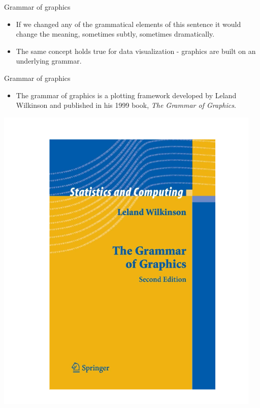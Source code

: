 \documentclass[
  ignorenonframetext,
]{beamer}
\providecommand{\tightlist}{%
  \setlength{\itemsep}{0pt}\setlength{\parskip}{0pt}}
\begin{document}
\begin{frame}{Grammar of graphics}
\label{grammar-of-graphics}
\begin{itemize}
\item
  If we changed any of the grammatical elements of this sentence it
  would change the meaning, sometimes subtly, sometimes dramatically.
\item
  The same concept holds true for data visualization - graphics are
  built on an underlying grammar.
\end{itemize}
\end{frame}

\begin{frame}{Grammar of graphics}
\label{grammar-of-graphics-1}
\begin{itemize}
\tightlist
\item
  The grammar of graphics is a plotting framework developed by Leland
  Wilkinson and published in his 1999 book, \emph{The Grammar of
  Graphics}.
\end{itemize}

\includegraphics{../images/im121.png}
\end{frame}
\end{document}
